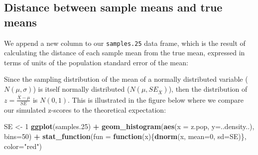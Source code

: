 \documentclass[]{book}
\newenvironment{Shaded}{\begin{snugshade}}{\end{snugshade}}
\newcommand{\CommentTok}[1]{\textcolor[rgb]{0.56,0.35,0.01}{\textit{#1}}}
\newcommand{\ControlFlowTok}[1]{\textcolor[rgb]{0.13,0.29,0.53}{\textbf{#1}}}
\newcommand{\DataTypeTok}[1]{\textcolor[rgb]{0.13,0.29,0.53}{#1}}
\newcommand{\DecValTok}[1]{\textcolor[rgb]{0.00,0.00,0.81}{#1}}
\newcommand{\FloatTok}[1]{\textcolor[rgb]{0.00,0.00,0.81}{#1}}
\newcommand{\KeywordTok}[1]{\textcolor[rgb]{0.13,0.29,0.53}{\textbf{#1}}}
\newcommand{\NormalTok}[1]{#1}
\newcommand{\OperatorTok}[1]{\textcolor[rgb]{0.81,0.36,0.00}{\textbf{#1}}}
\newcommand{\StringTok}[1]{\textcolor[rgb]{0.31,0.60,0.02}{#1}}
\theoremstyle{definition}
\theoremstyle{definition}
\theoremstyle{definition}
\theoremstyle{remark}
\begin{document}
\begin{Shaded}
\end{Shaded}

\hypertarget{distance-between-sample-means-and-true-means}{%
\subsection{Distance between sample means and true
means}\label{distance-between-sample-means-and-true-means}}

We append a new column to our \texttt{samples.25} data frame, which is
the result of calculating the distance of each sample mean from the true
mean, expressed in terms of units of the population standard error of
the mean:

\begin{Shaded}
\end{Shaded}

Since the sampling distribution of the mean of a normally distributed
variable (\(N(\mu,\sigma)\)) is itself normally distributed
(\(N(\mu, SE_{\overline{X}})\)), then the distribution of
\(z = \frac{\overline{X} - \mu}{SE}\) is \(N(0,1)\). This is illustrated
in the figure below where we compare our simulated z-scores to the
theoretical expectation:

\begin{Shaded}
\begin{Highlighting}[]
\NormalTok{SE <-}\StringTok{ }\DecValTok{1}
\KeywordTok{ggplot}\NormalTok{(samples}\FloatTok{.25}\NormalTok{) }\OperatorTok{+}
\StringTok{  }\KeywordTok{geom_histogram}\NormalTok{(}\KeywordTok{aes}\NormalTok{(}\DataTypeTok{x =}\NormalTok{ z.pop, }\DataTypeTok{y=}\NormalTok{..density..), }\DataTypeTok{bins=}\DecValTok{50}\NormalTok{) }\OperatorTok{+}\StringTok{ }
\StringTok{  }\KeywordTok{stat_function}\NormalTok{(}\DataTypeTok{fun =} \ControlFlowTok{function}\NormalTok{(x)\{}\KeywordTok{dnorm}\NormalTok{(x, }\DataTypeTok{mean=}\DecValTok{0}\NormalTok{, }\DataTypeTok{sd=}\NormalTok{SE)\}, }\DataTypeTok{color=}\StringTok{"red"}\NormalTok{)}
\end{Highlighting}
\end{Shaded}
\end{document}
